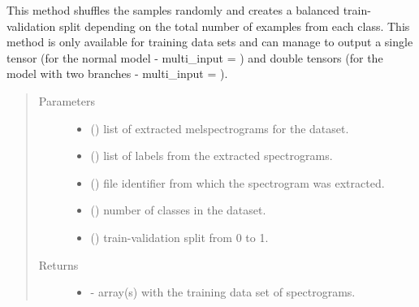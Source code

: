 \documentclass[letterpaper,10pt,english]{sphinxmanual}
\begin{document}
\begin{fulllineitems}
\begin{fulllineitems}
\begin{quote}
\begin{description}
\end{description}\end{quote}

\end{fulllineitems}


\begin{fulllineitems}
\label{\detokenize{generate_dataset:generate_dataset.GenerateDataset.validation_split}}
This method shuffles the samples randomly and creates a balanced train-validation split depending on 
the total number of examples from each class. This method is only available
for training data sets and can manage to output a single tensor (for the normal model - multi\_input = ) and double tensors
(for the model with two branches - multi\_input = ).
\begin{quote}\begin{description}
\item[{Parameters}] \leavevmode\begin{itemize}
\item {} 
 () \textendash{} list of extracted melspectrograms for the dataset.

\item {} 
 () \textendash{} list of labels from the extracted spectrograms.

\item {} 
 () \textendash{} file identifier from which the spectrogram was extracted.

\item {} 
 () \textendash{} number of classes in the dataset.

\item {} 
 () \textendash{} train-validation split from 0 to 1.

\end{itemize}

\item[{Returns}] \leavevmode
\begin{itemize}
\item {} 
  - array(s) with the training data set of spectrograms.


\end{itemize}
\end{description}
\end{quote}
\end{fulllineitems}
\end{fulllineitems}
\end{document}
